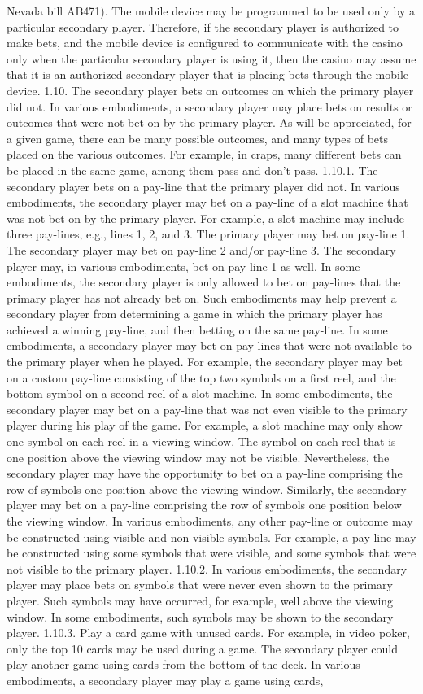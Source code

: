 \documentclass[11pt,a4paper]{article}
\begin{document}
Nevada bill AB471). The mobile device may be programmed to be used only by a particular secondary player. Therefore, if the secondary player is authorized to make bets, and the mobile device is configured to communicate with the casino only when the particular secondary player is using it, then the casino may assume that it is an authorized secondary player that is placing bets through the mobile device. 1.10. The secondary player bets on outcomes on which the primary player did not. In various embodiments, a secondary player may place bets on results or outcomes that were not bet on by the primary player. As will be appreciated, for a given game, there can be many possible outcomes, and many types of bets placed on the various outcomes. For example, in craps, many different bets can be placed in the same game, among them pass and don't pass. 1.10.1. The secondary player bets on a pay-line that the primary player did not. In various embodiments, the secondary player may bet on a pay-line of a slot machine that was not bet on by the primary player. For example, a slot machine may include three pay-lines, e.g., lines 1, 2, and 3. The primary player may bet on pay-line 1. The secondary player may bet on pay-line 2 and/or pay-line 3. The secondary player may, in various embodiments, bet on pay-line 1 as well. In some embodiments, the secondary player is only allowed to bet on pay-lines that the primary player has not already bet on. Such embodiments may help prevent a secondary player from determining a game in which the primary player has achieved a winning pay-line, and then betting on the same pay-line. In some embodiments, a secondary player may bet on pay-lines that were not available to the primary player when he played. For example, the secondary player may bet on a custom pay-line consisting of the top two symbols on a first reel, and the bottom symbol on a second reel of a slot machine. In some embodiments, the secondary player may bet on a pay-line that was not even visible to the primary player during his play of the game. For example, a slot machine may only show one symbol on each reel in a viewing window. The symbol on each reel that is one position above the viewing window may not be visible. Nevertheless, the secondary player may have the opportunity to bet on a pay-line comprising the row of symbols one position above the viewing window. Similarly, the secondary player may bet on a pay-line comprising the row of symbols one position below the viewing window. In various embodiments, any other pay-line or outcome may be constructed using visible and non-visible symbols. For example, a pay-line may be constructed using some symbols that were visible, and some symbols that were not visible to the primary player. 1.10.2. In various embodiments, the secondary player may place bets on symbols that were never even shown to the primary player. Such symbols may have occurred, for example, well above the viewing window. In some embodiments, such symbols may be shown to the secondary player. 1.10.3. Play a card game with unused cards. For example, in video poker, only the top 10 cards may be used during a game. The secondary player could play another game using cards from the bottom of the deck. In various embodiments, a secondary player may play a game using cards, 
\end{document}
